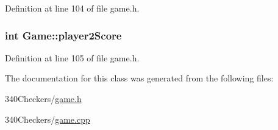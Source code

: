 Definition at line 104 of file game.\-h.

\hypertarget{class_game_a6ceb54d51da7bfd37492c3ebcea60412}{
\subsubsection[{player2\-Score}]{\setlength{\rightskip}{0pt plus 5cm}int Game\-::player2\-Score}}\label{class_game_a6ceb54d51da7bfd37492c3ebcea60412}


Definition at line 105 of file game.\-h.



The documentation for this class was generated from the following files\-:\begin{DoxyCompactItemize}
\item 
340\-Checkers/\hyperlink{game_8h}{game.\-h}\item 
340\-Checkers/\hyperlink{game_8cpp}{game.\-cpp}\end{DoxyCompactItemize}
